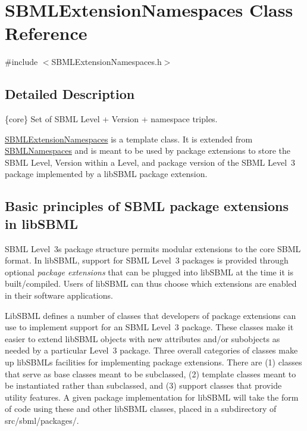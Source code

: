 \hypertarget{class_s_b_m_l_extension_namespaces}{}\section{S\+B\+M\+L\+Extension\+Namespaces Class Reference}
\label{class_s_b_m_l_extension_namespaces}


{\ttfamily \#include $<$S\+B\+M\+L\+Extension\+Namespaces.\+h$>$}



\subsection{Detailed Description}
\{core\} Set of S\+B\+ML Level + Version + namespace triples.



\hyperlink{class_s_b_m_l_extension_namespaces}{S\+B\+M\+L\+Extension\+Namespaces} is a template class. It is extended from \hyperlink{class_s_b_m_l_namespaces}{S\+B\+M\+L\+Namespaces} and is meant to be used by package extensions to store the S\+B\+ML Level, Version within a Level, and package version of the S\+B\+ML Level~3 package implemented by a lib\+S\+B\+ML package extension.\hypertarget{classdoc__basics__of__extensions_ext-basics}{}\subsection{Basic principles of S\+B\+M\+L package extensions in lib\+S\+B\+ML}\label{classdoc__basics__of__extensions_ext-basics}
\begin{DoxyParagraph}{}
S\+B\+ML Level~3\textquotesingle{}s package structure permits modular extensions to the core S\+B\+ML format. In lib\+S\+B\+ML, support for S\+B\+ML Level~3 packages is provided through optional {\itshape package extensions} that can be plugged into lib\+S\+B\+ML at the time it is built/compiled. Users of lib\+S\+B\+ML can thus choose which extensions are enabled in their software applications.
\end{DoxyParagraph}
Lib\+S\+B\+ML defines a number of classes that developers of package extensions can use to implement support for an S\+B\+ML Level~3 package. These classes make it easier to extend lib\+S\+B\+ML objects with new attributes and/or subobjects as needed by a particular Level~3 package. Three overall categories of classes make up lib\+S\+B\+ML\textquotesingle{}s facilities for implementing package extensions. There are (1) classes that serve as base classes meant to be subclassed, (2) template classes meant to be instantiated rather than subclassed, and (3) support classes that provide utility features. A given package implementation for lib\+S\+B\+ML will take the form of code using these and other lib\+S\+B\+ML classes, placed in a subdirectory of {\ttfamily src/sbml/packages/}.


